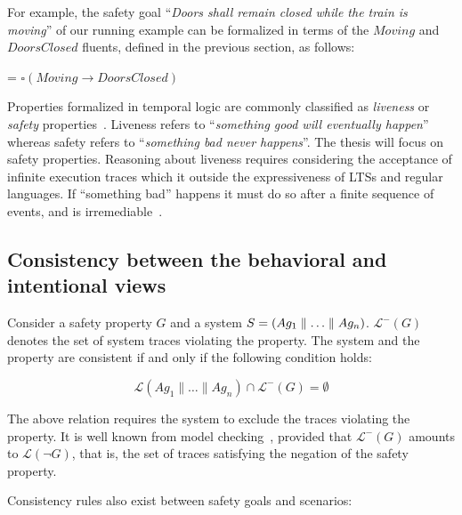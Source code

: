 For example, the safety goal ``\emph{Doors shall remain closed while the train is moving}'' of our running example can be formalized in terms of the $Moving$ and $DoorsClosed$ fluents, defined in the previous section, as follows:

\begin{center}
 = $\square(Moving \rightarrow DoorsClosed)$
\end{center}

Properties formalized in temporal logic are commonly classified as \emph{liveness} or \emph{safety} properties~\cite{Alpern:1986}. Liveness refers to ``\emph{something good will eventually happen}'' whereas safety refers to  ``\emph{something bad never happens}''. The thesis will focus on safety properties. Reasoning about liveness requires considering the acceptance of infinite execution traces which it outside the expressiveness of LTSs and regular languages. If ``something bad'' happens it must do so after a finite sequence of events, and is irremediable~\cite{Alpern:1986, Giannakopoulou:1999}.

\subsection{Consistency between the behavioral and intentional views}

Consider a safety property $G$ and a system $S = (Ag_1 \parallel \ldots \parallel Ag_n)$. $\mathcal{L}^{-}(G)$ denotes the set of system traces violating the property. The system and the property are consistent if and only if the following condition holds:

\begin{equation}
\mathcal{L}(Ag_1 \parallel \ldots \parallel Ag_n) \cap \mathcal{L}^{-}(G) = \emptyset
\label{equation:state-machines-and-goals-consistency}
\end{equation}

The above relation requires the system to exclude the traces violating the property. It is well known from model checking~\cite{Clarke:1989}, provided that $\mathcal{L}^{-}(G)$ amounts to $\mathcal{L}(\neg G)$, that is, the set of traces satisfying the negation of the safety property. 

Consistency rules also exist between safety goals and scenarios:

